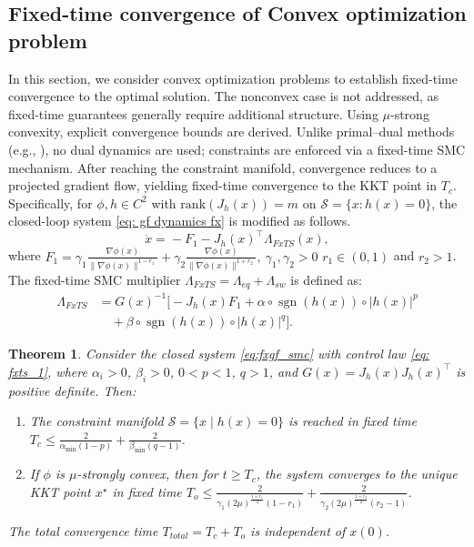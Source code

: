 \documentclass[letterpaper, 10 pt, conference]{ieeeconf}
\newtheorem{theorem}{Theorem}
\begin{document}
\subsection{Fixed-time convergence of Convex optimization problem}
In this section, we consider convex optimization problems to establish fixed-time convergence to the optimal solution. The nonconvex case is not addressed, as fixed-time guarantees generally require additional structure. Using $\mu$-strong convexity, explicit convergence bounds are derived. Unlike primal–dual methods (e.g., \cite{OJ24,garg_fixed}), no dual dynamics are used; constraints are enforced via a fixed-time SMC mechanism. After reaching the constraint manifold, convergence reduces to a projected gradient flow, yielding fixed-time convergence to the KKT point in $T_c$. Specifically, for $\phi,h\in C^2$ with $\mathrm{rank}(J_h(x))=m$ on $\mathcal{S}=\{x:h(x)=0\}$, the closed-loop system \eqref{eq: gf dynamics fx} is modified as follows.
\begin{equation} \label{eq:fxgf_smc}
 \dot{x}=\!\!-F_1-\!J_h(x)^\top\! \Lambda_{FxTS}(x),   
\end{equation}
where $F_1=\gamma_1\frac{\nabla \phi(x)}{\|\nabla \phi(x)\|^{1-r_1}}+\gamma_2\frac{\nabla \phi(x)}{\|\nabla \phi(x)\|^{1+r_2}},~\gamma_1, \gamma_2>0$ $r_1 \in (0,1)$ and $r_2>1$. The fixed-time SMC multiplier $\Lambda_{FxTS}=\Lambda_{eq}+\Lambda_{sw}$ is defined as:
\begin{equation} \label{eq: fxts_1}
\begin{aligned}
\Lambda_{FxTS}
&= G(x)^{-1}\Big[-J_h(x)F_1 +\alpha \circ \operatorname{sgn}(h(x)) \circ |h(x)|^{p}\\
&\quad+ \beta \circ \operatorname{sgn}(h(x)) \circ |h(x)|^{q}
\Big].
\end{aligned}
\end{equation}
\begin{theorem}
Consider the closed system \eqref{eq:fxgf_smc} with control law \eqref{eq: fxts_1}, where 
$\alpha_i>0$, $\beta_i>0$, $0<p<1$, $q>1$, and $G(x)=J_h(x)J_h(x)^\top$ is positive definite.
Then:
\begin{enumerate}
    \item The constraint manifold $\mathcal{S}=\{x\mid h(x)=0\}$ is reached in fixed time $T_c \le \frac{2}{\alpha_{\min}(1-p)} + \frac{2}{\beta_{\min}(q-1)}$.
   
    \item If $\phi$ is $\mu$-strongly convex, then for $t\ge T_c$, the system converges to 
    the unique KKT point $x^\star$ in fixed time $T_o \le \frac{2}{\gamma_1(2\mu)^{\frac{1+r_1}{2}}(1-r_1)} + \frac{2}{\gamma_2(2\mu)^{\frac{1+r_2}{2}}(r_2-1)}$.
\end{enumerate}
The total convergence time $T_{total}=T_c+T_o$ is independent of $x(0)$.
\end{theorem}
\end{document}
